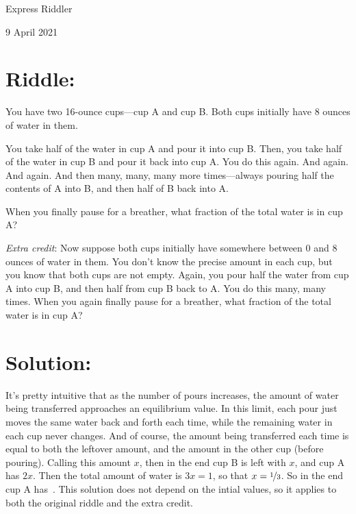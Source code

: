 \documentclass{article}
\begin{document}
\pagestyle{empty} %

\begin{center}
{\LARGE Express Riddler}

\vspace{0.15in}

{\Large 9 April 2021}
\end{center}


\section*{Riddle:}

You have two 16-ounce cups---cup A and cup B.
Both cups initially have 8 ounces of water in them.

You take half of the water in cup A and pour it into cup B.
Then, you take half of the water in cup B and pour it back into cup A.
You do this again.
And again.
And again.
And then many, many, many more times---always pouring half the contents of A into B, and then half of B back into A.

When you finally pause for a breather, what fraction of the total water is in cup A?

\textit{Extra credit}: Now suppose both cups initially have somewhere between 0 and 8 ounces of water in them.
You don't know the precise amount in each cup, but you know that both cups are not empty.
Again, you pour half the water from cup A into cup B, and then half from cup B back to A.
You do this many, many times.
When you again finally pause for a breather, what fraction of the total water is in cup A?



\section*{Solution:}

It's pretty intuitive that as the number of pours increases, the amount of water being transferred approaches an equilibrium value.
In this limit, each pour just moves the same water back and forth each time, while the remaining water in each cup never changes.
And of course, the amount being transferred each time is equal to both the leftover amount, and the amount in the other cup (before pouring).
Calling this amount $x$, then in the end cup B is left with $x$, and cup A has $2x$.
Then the total amount of water is $3x=1$, so that $x=\nicefrac{1}{3}$.
So in the end cup A has
\,.
This solution does not depend on the intial values, so it applies to both the original riddle and the extra credit.
\end{document}
